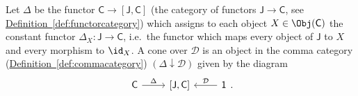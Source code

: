 \documentclass[main.tex]{subfiles}
\begin{document}
\begin{definition}[cone]
  \label{def:cone}

  Let $\Delta$ be the functor $\mathsf{C} \rightarrow [\mathsf{J}, \mathsf{C}]$ (the category of functors $\mathsf{J} \rightarrow \mathsf{C}$, see \hyperref[def:functorcategory]{Definition~\ref*{def:functorcategory}}) which assigns to each object $X \in \Obj(\mathsf{C})$ the constant functor $\Delta_{X}: \mathsf{J} \rightarrow \mathsf{C}$, i.e.\ the functor which maps every object of $\mathsf{J}$ to $X$ and every morphism to $\id_{X}$. A cone over $\mathcal{D}$ is an object in the comma category (\hyperref[def:commacategory]{Definition~\ref*{def:commacategory}}) $(\Delta \downarrow \mathcal{D})$ given by the diagram
  \begin{equation*}
    \begin{tikzcd}
      \mathsf{C}
      \arrow[r, rightarrow, "\Delta"]
      & {[\mathsf{J}, \mathsf{C}]}
      & \mathsf{1}
      \arrow[l, swap, rightarrow, "\mathcal{D}"]
    \end{tikzcd}.
  \end{equation*}


\end{definition}
\end{document}
